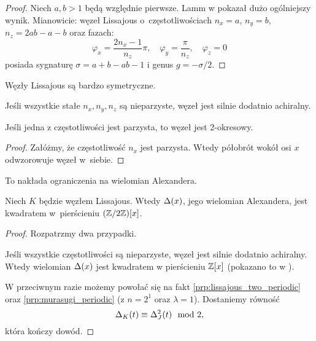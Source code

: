 \begin{proof}
    Niech $a, b > 1$ będą względnie pierwsze.
    Lamm w \cite{lamm97} pokazał dużo ogólniejszy wynik.
    Mianowicie: węzeł Lissajous o~częstotliwościach $n_x = a$, $n_y = b$, $n_z = 2ab-a-b$ oraz fazach:
    \begin{equation}
        \varphi_x = \frac{2n_x-1}{n_z} \pi, \quad
        \varphi_y = \frac{\pi}{n_z}, \quad
        \varphi_z = 0
    \end{equation}
    posiada sygnaturę $\sigma = a+b-ab-1$ i genus $g = -\sigma/2$.
%
%
\end{proof}

Węzły Lissajous są bardzo symetryczne.

\begin{proposition}
    Jeśli wszystkie stałe $n_x, n_y, n_z$ są nieparzyste, węzeł jest silnie dodatnio achiralny.
\end{proposition}

\begin{proposition}
%
\label{prp:lissajous_two_periodic}%
    Jeśli jedna z częstotliwości jest parzysta, to węzeł jest 2-okresowy.
\end{proposition}

\begin{proof}
    Załóżmy, że częstotliwość $n_x$ jest parzysta.
    Wtedy półobrót wokół osi $x$ odwzorowuje węzeł w~siebie.
\end{proof}

To nakłada ograniczenia na wielomian Alexandera.

\begin{proposition}
\label{prp:lissajous_alexander}%
    Niech $K$ będzie węzłem Lissajous.
    Wtedy $\Delta(x)$, jego wielomian Alexandera, jest kwadratem w~pierścieniu $(\mathbb Z/2\mathbb Z)[x]$.
\end{proposition}

\begin{proof}
    Rozpatrzmy dwa przypadki.

    Jeśli wszystkie częstotliwości są nieparzyste, węzeł jest silnie dodatnio achiralny.
    Wtedy wielomian $\Delta(x)$ jest kwadratem w pierścieniu $\mathbb Z[x]$ (pokazano to w \cite{hartley79}).

    W przeciwnym razie możemy powołać się na fakt \ref{prp:lissajous_two_periodic} oraz \ref{prp:murasugi_periodic} (z $n=2^1$ oraz $\lambda = 1$).
    Dostaniemy równość
    \begin{equation}
\label{eqn:lissajous_squared}%
        \alexander_K(t) \equiv \alexander^2_{J}(t) \mod 2,
    \end{equation}
    która kończy dowód.
\end{proof}

